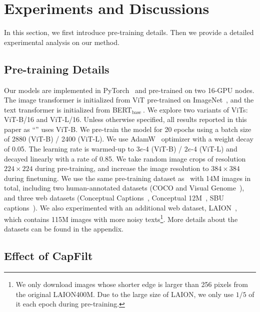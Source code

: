 \vspace{-1ex}
\section{Experiments and Discussions}
\label{sec:experiment}
In this section, we first introduce pre-training details. Then we provide a detailed experimental analysis on our method.

\vspace{-1ex}
\subsection{Pre-training Details}
\vspace{-0.5ex}

Our models are implemented in PyTorch~\cite{pytorch} and pre-trained on two 16-GPU nodes.
The image transformer is initialized from ViT pre-trained on ImageNet~\cite{deit,vit},
and the text transformer is initialized from BERT$_\mathrm{base}~$\cite{bert}.
We explore two variants of ViTs: ViT-B/16 and ViT-L/16.
Unless otherwise specified, all results reported in this paper as ``\name'' uses ViT-B.
We pre-train the model for 20 epochs using a batch size of 2880 (ViT-B) / 2400 (ViT-L). 
We use AdamW~\cite{adamw} optimizer with a weight decay of 0.05. 
The learning rate is warmed-up to $3e$-4 (ViT-B) / $2e$-4 (ViT-L) and decayed linearly with a rate of 0.85.
We take random image crops of resolution $224\times224$ during pre-training, and increase the image resolution to $384\times384$ during finetuning.
We use the same pre-training dataset as~\citet{ALBEF} with 14M images in total,
including two human-annotated datasets (COCO and Visual Genome~\cite{VG}),
and three web datasets (Conceptual Captions~\cite{cc12m}, Conceptual 12M~\cite{cc12m}, SBU captions~\cite{sbu}).
We also experimented with an additional web dataset, LAION~\cite{laion}, which contains 115M images with more noisy texts\footnote{We only download images whose shorter edge is larger than 256 pixels from the original LAION400M. Due to the large size of LAION, we only use $1/5$ of it each epoch during pre-training.}.
More details about the datasets can be found in the appendix.






\vspace{-0.5ex}
\subsection{Effect of CapFilt}
\vspace{-0.5ex}

